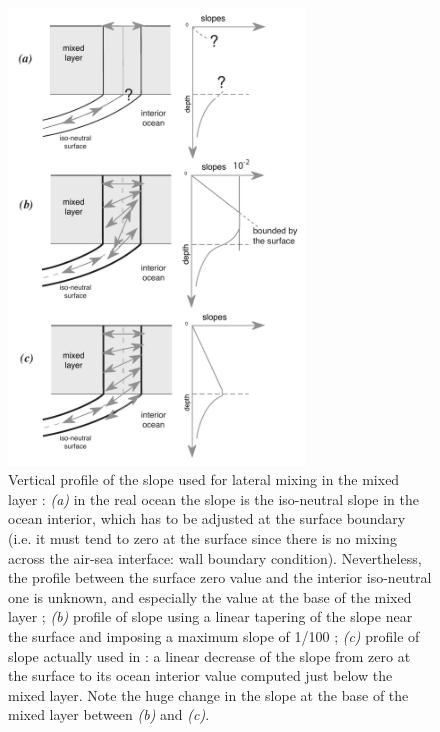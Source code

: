 {%
\begin{figure}[!ht]     \begin{center}
\includegraphics[width=0.70\textwidth]{./TexFiles/Figures/Fig_eiv_slp.pdf}
\caption {     \label{Fig_eiv_slp}
Vertical profile of the slope used for lateral mixing in the mixed layer : 
\textit{(a)} in the real ocean the slope is the iso-neutral slope in the ocean interior, 
which has to be adjusted at the surface boundary (i.e. it must tend to zero at the 
surface since there is no mixing across the air-sea interface: wall boundary 
condition). Nevertheless, the profile between the surface zero value and the interior 
iso-neutral one is unknown, and especially the value at the base of the mixed layer ; 
\textit{(b)} profile of slope using a linear tapering of the slope near the surface and 
imposing a maximum slope of 1/100 ; \textit{(c)} profile of slope actually used in 
\NEMO: a linear decrease of the slope from zero at the surface to its ocean interior 
value computed just below the mixed layer. Note the huge change in the slope at the 
base of the mixed layer between  \textit{(b)}  and \textit{(c)}.}
\end{center}   \end{figure}

}
